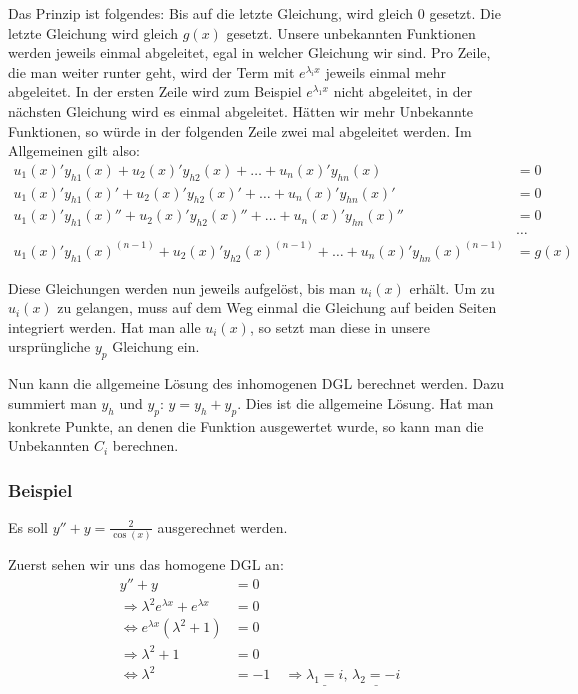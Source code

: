Das Prinzip ist folgendes: Bis auf die letzte Gleichung, wird gleich $0$ gesetzt.
Die letzte Gleichung wird gleich $g(x)$ gesetzt.
Unsere unbekannten Funktionen werden jeweils einmal abgeleitet, egal in welcher
Gleichung wir sind. Pro Zeile, die man weiter runter geht, wird der Term mit $e^{\lambda_i x}$
jeweils einmal mehr abgeleitet. In der ersten Zeile wird zum Beispiel $e^{\lambda_1 x}$ nicht abgeleitet,
in der nächsten Gleichung wird es einmal abgeleitet. Hätten wir mehr Unbekannte Funktionen,
so würde in der folgenden Zeile zwei mal abgeleitet werden. Im Allgemeinen gilt also:
{\footnotesize
\begin{align*}
u_1(x)' y_{h1}(x) + u_2(x)' y_{h2}(x) + \ldots + u_n(x)' y_{hn}(x) &= 0\\
u_1(x)' y_{h1}(x)' + u_2(x)' y_{h2}(x)' + \ldots + u_n(x)' y_{hn}(x)' &= 0\\
u_1(x)' y_{h1}(x)'' + u_2(x)' y_{h2}(x)'' + \ldots + u_n(x)' y_{hn}(x)'' &= 0\\
&\ldots\\
u_1(x)' y_{h1}(x)^{(n-1)} + u_2(x)' y_{h2}(x)^{(n-1)} + \ldots + u_n(x)' y_{hn}(x)^{(n-1)} &= g(x)
\end{align*}
}

Diese Gleichungen werden nun jeweils aufgelöst, bis man $u_i(x)$ erhält. Um zu
$u_i(x)$ zu gelangen, muss auf dem Weg einmal die Gleichung auf beiden Seiten
integriert werden. Hat man alle $u_i(x)$, so setzt man diese in unsere
ursprüngliche $y_p$ Gleichung ein.

Nun kann die allgemeine Lösung des inhomogenen DGL berechnet werden. Dazu
summiert man $y_h$ und $y_p$: $y = y_h + y_p$. Dies ist die allgemeine Lösung.
Hat man konkrete Punkte, an denen die Funktion ausgewertet wurde, so kann man
die Unbekannten $C_i$ berechnen.

\subsubsection{Beispiel}
Es soll $y'' + y = \frac{2}{\cos(x)}$ ausgerechnet werden.

Zuerst sehen wir uns das homogene DGL an:
\begin{align*}
y'' + y &= 0\\
\Rightarrow \lambda^2 e^{\lambda x} + e^{\lambda x} &= 0\\
\Leftrightarrow e^{\lambda x} (\lambda^2 + 1) &=0 \\
\Rightarrow \lambda^2 + 1 &= 0\\
\Leftrightarrow \lambda^2 &= -1 \quad
\Rightarrow \underline{\lambda_1 = i},\, \underline{\lambda_2 = -i}
\end{align*}

